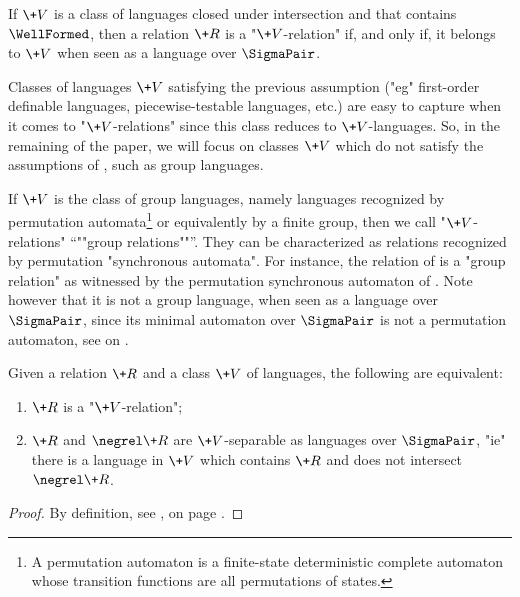 \begin{fact}
	\label{fact:a-triviality-on-trivial-relations}
	If $\+V$ is a class of languages closed under intersection and that contains $\WellFormed$, then
	a relation $\+R$ is a "$\+V$-relation" if, and only if, it belongs to $\+V$ when seen
	as a language over $\SigmaPair$.
\end{fact}

Classes of languages $\+V$ satisfying the previous assumption ("eg" first-order definable languages, piecewise-testable languages, etc.) are easy to capture when
it comes to "$\+V$-relations" since this class reduces to $\+V$-languages.
So, in the remaining of the paper, we will focus on classes $\+V$ which do not satisfy
the assumptions of , such as group languages.

\begin{example}
	\label{ex:group-languages}
	If $\+V$ is the class
	of group languages, namely languages recognized by permutation automata\footnote{A permutation 
	automaton is a finite-state deterministic complete automaton whose transition functions are all 
	permutations of states.} or equivalently by a finite group, then we call
	"$\+V$-relations" \AP``""group relations""''. They can be characterized 
	as relations recognized by permutation "synchronous automata". For instance, the relation
	of  is a "group relation" as witnessed by the permutation synchronous automaton of . Note however that it is not a group language, when seen as a language over $\SigmaPair$, since its minimal automaton over $\SigmaPair$ is not
	a permutation automaton, see  on .
\end{example}

\begin{fact}
	\label{fact:separability}
	Given a relation $\+R$ and a class $\+V$ of languages, the following are equivalent:
	\begin{enumerate}
		\item $\+R$ is a "$\+V$-relation";
		\item $\+R$ and $\negrel \+R$ are $\+V$-separable as languages over $\SigmaPair$,
		"ie" there is a language in $\+V$ which contains $\+R$ and does not intersect $\negrel \+R$.
	\end{enumerate}
\end{fact}

\begin{proof}
	By definition, see , on page \pageref{fig:projection}.
\end{proof}

